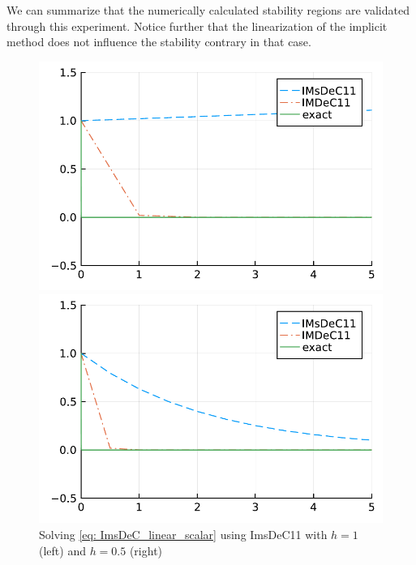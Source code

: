 We can summarize that the numerically calculated stability regions are validated through this experiment. 
Notice further that the linearization of the implicit method does not influence the stability contrary in that case. 
\begin{figure}
	\centering
	\begin{minipage}[t]{0.45\textwidth}
		\includegraphics[width=\textwidth]{pdf/odepics/BspImsDeC/sol_ImsDeC11_GLB_stable10.pdf}
	\end{minipage}
	\begin{minipage}[t]{0.45\textwidth}
		\includegraphics[width=\textwidth]{pdf/odepics/BspImsDeC/sol_ImsDeC11_GLB_stable20.pdf}
	\end{minipage}
	\caption{Solving \eqref{eq: ImsDeC_linear_scalar} using ImsDeC11 with $h=1$ (left) and $h=0.5$ (right)}
	\label{fig: exaImsDeC1}
\end{figure}

